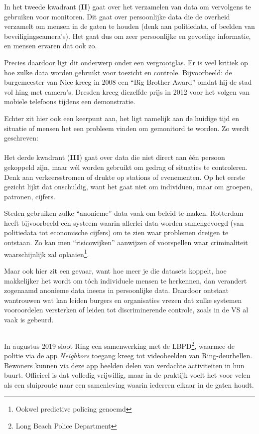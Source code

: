 \documentclass[nonacm,sigconf]{acmart}
\begin{document}
    In het tweede kwadrant (\textbf{II}) gaat over het verzamelen van data om vervolgens te gebruiken voor monitoren.
    Dit gaat over persoonlijke data die de overheid verzamelt om mensen in de gaten te houden (denk aan politiedata, of beelden van beveiligingscamera’s).
    Het gaat dus om zeer persoonlijke en gevoelige informatie, en mensen ervaren dat ook zo.

    Precies daardoor ligt dit onderwerp onder een vergrootglas.
    Er is veel kritiek op hoe zulke data worden gebruikt voor toezicht en controle.
    Bijvoorbeeld: de burgemeester van Nice kreeg in 2008 een “Big Brother Award” omdat hij de stad vol hing met camera’s.
    Dresden kreeg diezelfde prijs in 2012 voor het volgen van mobiele telefoons tijdens een demonstratie.

    Echter zit hier ook een keerpunt aan, het ligt namelijk aan de huidige tijd en situatie of mensen het een probleem vinden om gemonitord te worden.
    Zo werdt geschreven:
    \\
    \\
    Het derde kwadrant (\textbf{III}) gaat over data die niet direct aan één persoon gekoppeld zijn, maar wél worden gebruikt om gedrag of situaties te controleren.
    Denk aan verkeersstromen of drukte op stations of evenementen.
    Op het eerste gezicht lijkt dat onschuldig, want het gaat niet om individuen, maar om groepen, patronen, cijfers.

    Steden gebruiken zulke “anonieme” data vaak om beleid te maken.
    Rotterdam heeft bijvoorbeeld een systeem waarin allerlei data worden samengevoegd (van politiedata tot economische cijfers) om te zien waar problemen dreigen te ontstaan.
    Zo kan men “risicowijken” aanwijzen of voorspellen waar criminaliteit waarschijnlijk zal oplaaien\footnote{Ookwel predictive policing genoemd}.

    Maar ook hier zit een gevaar, want hoe meer je die datasets koppelt, hoe makkelijker het wordt om tóch individuele mensen te herkennen, dan verandert zogenaamd anonieme data ineens in persoonlijke data.
    Daardoor ontstaat wantrouwen wat kan leiden burgers en organisaties vrezen dat zulke systemen vooroordelen versterken of leiden tot discriminerende controle, zoals in de VS al vaak is gebeurd.

    \subsection{}
    \parencite{shaffer2021applying} In augustus 2019 sloot Ring een samenwerking met de LBPD\footnote{Long Beach Police Department}, waarmee de politie via de app \textit{Neighbors} toegang kreeg tot videobeelden van Ring-deurbellen. Bewoners kunnen via deze app beelden delen van verdachte activiteiten in hun buurt. Officieel is dat volledig vrijwillig, maar in de praktijk voelt het voor velen als een sluiproute naar een samenleving waarin iedereen elkaar in de gaten houdt.
\end{document}
